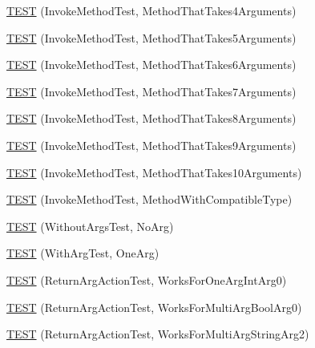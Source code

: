 \begin{DoxyCompactItemize}
\item 
\mbox{\hyperlink{namespacetesting_1_1gmock__more__actions__test_af0ab6ef9fdf48e8442a5579ab27eb517}{T\+E\+ST}} (Invoke\+Method\+Test, Method\+That\+Takes4\+Arguments)
\item 
\mbox{\hyperlink{namespacetesting_1_1gmock__more__actions__test_a512db122c5beadeeef026bb54aec7e45}{T\+E\+ST}} (Invoke\+Method\+Test, Method\+That\+Takes5\+Arguments)
\item 
\mbox{\hyperlink{namespacetesting_1_1gmock__more__actions__test_a715c088109e141aa577e497e3729b98b}{T\+E\+ST}} (Invoke\+Method\+Test, Method\+That\+Takes6\+Arguments)
\item 
\mbox{\hyperlink{namespacetesting_1_1gmock__more__actions__test_a1f11171c55d049143c980502213e0b11}{T\+E\+ST}} (Invoke\+Method\+Test, Method\+That\+Takes7\+Arguments)
\item 
\mbox{\hyperlink{namespacetesting_1_1gmock__more__actions__test_a5bfedd2255bbfe7ffcbc76ec581b2ff6}{T\+E\+ST}} (Invoke\+Method\+Test, Method\+That\+Takes8\+Arguments)
\item 
\mbox{\hyperlink{namespacetesting_1_1gmock__more__actions__test_acdcc7f6a35e6373f3d0b3a71f98c418b}{T\+E\+ST}} (Invoke\+Method\+Test, Method\+That\+Takes9\+Arguments)
\item 
\mbox{\hyperlink{namespacetesting_1_1gmock__more__actions__test_a14b55eb4c0d0b3149e269eea1443cb58}{T\+E\+ST}} (Invoke\+Method\+Test, Method\+That\+Takes10\+Arguments)
\item 
\mbox{\hyperlink{namespacetesting_1_1gmock__more__actions__test_adb0c29d688c079ad5bf07d5a0bd72aea}{T\+E\+ST}} (Invoke\+Method\+Test, Method\+With\+Compatible\+Type)
\item 
\mbox{\hyperlink{namespacetesting_1_1gmock__more__actions__test_a68748f21021e787dfdc095691c94d495}{T\+E\+ST}} (Without\+Args\+Test, No\+Arg)
\item 
\mbox{\hyperlink{namespacetesting_1_1gmock__more__actions__test_a40664c1acdc3650e8edf9a9a49b008de}{T\+E\+ST}} (With\+Arg\+Test, One\+Arg)
\item 
\mbox{\hyperlink{namespacetesting_1_1gmock__more__actions__test_a717ea38d7b78b6d51b4d617ed317d26e}{T\+E\+ST}} (Return\+Arg\+Action\+Test, Works\+For\+One\+Arg\+Int\+Arg0)
\item 
\mbox{\hyperlink{namespacetesting_1_1gmock__more__actions__test_a0705d7e6083d129caae9d91cc5d6d570}{T\+E\+ST}} (Return\+Arg\+Action\+Test, Works\+For\+Multi\+Arg\+Bool\+Arg0)
\item 
\mbox{\hyperlink{namespacetesting_1_1gmock__more__actions__test_ae280b3b95b0cdfcf7b81de95c8fe942d}{T\+E\+ST}} (Return\+Arg\+Action\+Test, Works\+For\+Multi\+Arg\+String\+Arg2)

\end{DoxyCompactItemize}
